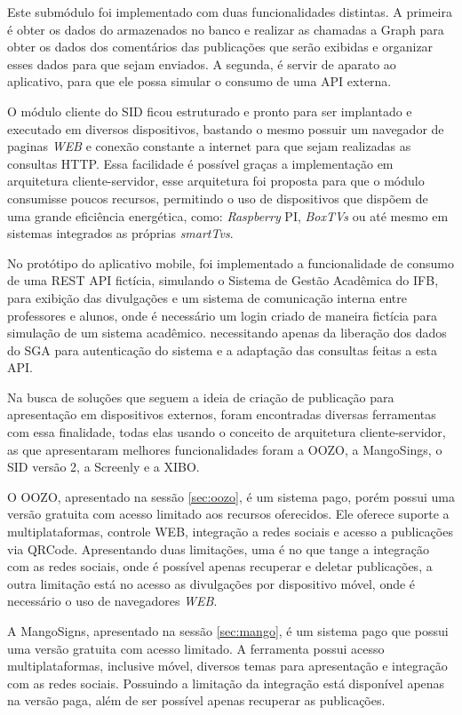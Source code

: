 Este submódulo foi implementado com duas funcionalidades distintas. A primeira é obter os dados do armazenados no banco e realizar as chamadas a Graph para obter os dados dos comentários das publicações que serão exibidas e organizar esses dados para que sejam enviados. A segunda, é servir de aparato ao aplicativo, para que ele possa simular o consumo de uma API externa. 

O módulo cliente do SID ficou estruturado e pronto para ser implantado e executado em diversos dispositivos, bastando o mesmo possuir um navegador de paginas \textit{WEB} e conexão constante a internet para que sejam realizadas as consultas HTTP. Essa facilidade é possível graças a implementação em arquitetura cliente-servidor, esse arquitetura foi proposta para que o módulo consumisse poucos recursos, permitindo o uso de dispositivos que dispõem de uma grande eficiência energética, como: \textit{Raspberry} PI, \textit{BoxTVs} ou até mesmo em sistemas integrados as próprias \textit{smartTvs}.

No protótipo do aplicativo mobile, foi implementado a funcionalidade de consumo de uma REST API fictícia, simulando o Sistema de Gestão Acadêmica do IFB, para exibição das divulgações e um sistema de comunicação interna entre professores e alunos, onde é necessário um login criado de maneira fictícia para simulação de um sistema acadêmico. necessitando apenas da liberação dos dados do SGA para autenticação do sistema e a adaptação das consultas feitas a esta API.

Na busca de soluções que seguem a ideia de criação de publicação para apresentação em dispositivos externos, foram encontradas diversas ferramentas com essa finalidade, todas elas usando o conceito de arquitetura cliente-servidor, as que apresentaram melhores funcionalidades foram a OOZO, a MangoSings, o SID versão 2, a Screenly e a XIBO.

O OOZO, apresentado na sessão \ref{sec:oozo}, é um sistema pago, porém possui uma versão gratuita com acesso limitado aos recursos oferecidos. Ele oferece suporte a multiplataformas, controle WEB, integração a redes sociais e acesso a publicações via QRCode. Apresentando duas limitações, uma é no que tange a integração com as redes sociais, onde é possível apenas recuperar e deletar publicações, a outra limitação está no acesso as divulgações por dispositivo móvel, onde é necessário o uso de navegadores \textit{WEB}. 

A MangoSigns, apresentado na sessão \ref{sec:mango}, é um sistema pago que possui uma versão gratuita com acesso limitado. A ferramenta possui acesso multiplataformas, inclusive móvel, diversos temas para apresentação e integração com as redes sociais. Possuindo a limitação da integração está disponível apenas na versão paga, além de ser possível apenas recuperar as publicações.

